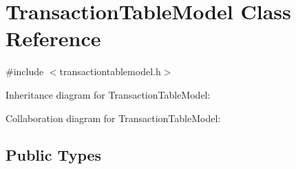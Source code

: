 \hypertarget{class_transaction_table_model}{}\section{Transaction\+Table\+Model Class Reference}
\label{class_transaction_table_model}


{\ttfamily \#include $<$transactiontablemodel.\+h$>$}



Inheritance diagram for Transaction\+Table\+Model\+:


Collaboration diagram for Transaction\+Table\+Model\+:
\subsection*{Public Types}
